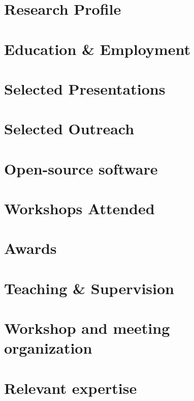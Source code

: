 \documentclass[12pt, letterpaper]{hunt-cv}
\begin{document}
\thispagestyle{plain}  %

\cvTitle

\section*{Research Profile}


\section*{Education \& Employment}


\section*{Selected Presentations}


\section*{Selected Outreach}


\section*{Open-source software \href{\cvGitHubLink}{\faGithub}}


\section*{Workshops Attended}


\section*{Awards}


\section*{Teaching \& Supervision}


\section*{Workshop and meeting organization}


\section*{Relevant expertise}

\end{document}
